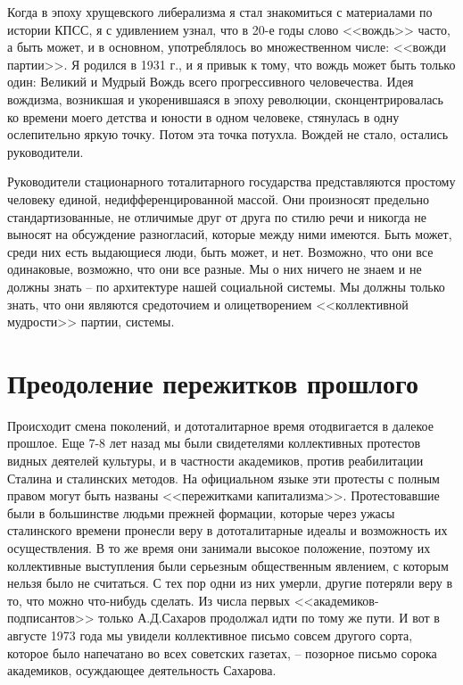 \documentclass{book}
\begin{document}
Когда в эпоху хрущевского либерализма я стал знакомиться с материалами по истории КПСС, я с удивлением узнал, что в 20-е годы слово <<вождь>> часто, а быть может, и в основном, употреблялось во множественном числе: <<вожди партии>>. Я родился в 1931 г., и я привык к тому, что вождь может быть только один: Великий и Мудрый Вождь всего прогрессивного человечества. Идея вождизма, возникшая и укоренившаяся в эпоху революции, сконцентрировалась ко времени моего детства и юности в одном человеке, стянулась в одну ослепительно яркую точку. Потом эта точка потухла. Вождей не стало, остались руководители.

Руководители стационарного тоталитарного государства представляются простому человеку единой, недифференцированной массой. Они произносят предельно стандартизованные, не отличимые друг от друга по стилю речи и никогда не выносят на обсуждение разногласий, которые между ними имеются. Быть может, среди них есть выдающиеся люди, быть может, и нет. Возможно, что они все одинаковые, возможно, что они все разные. Мы о них ничего не знаем и не должны знать -- по архитектуре нашей социальной системы. Мы должны только знать, что они являются средоточием и олицетворением <<коллективной мудрости>> партии, системы.



\section{Преодоление пережитков прошлого}

Происходит смена поколений, и дототалитарное время отодвигается в далекое прошлое. Еще 7-8 лет назад мы были свидетелями 
коллективных протестов видных деятелей культуры, и в частности академиков, против реабилитации Сталина и сталинских методов. На 
официальном языке эти протесты с полным правом могут быть названы <<пережитками капитализма>>. Протестовавшие были в большинстве 
людьми прежней формации, которые через ужасы сталинского времени пронесли веру в дототалитарные идеалы и возможность их 
осуществления. В то же время они занимали высокое положение, поэтому их коллективные выступления были серьезным общественным 
явлением, с которым нельзя было не считаться. С тех пор одни из них умерли, другие потеряли веру в то, что можно что-нибудь 
сделать. Из числа первых <<академиков-подписантов>> только А.Д.Сахаров продолжал идти по тому же пути. И вот в августе 1973 года 
мы увидели коллективное письмо совсем другого сорта, которое было напечатано во всех советских газетах, -- позорное письмо 
сорока академиков, осуждающее деятельность Сахарова.
\end{document}
